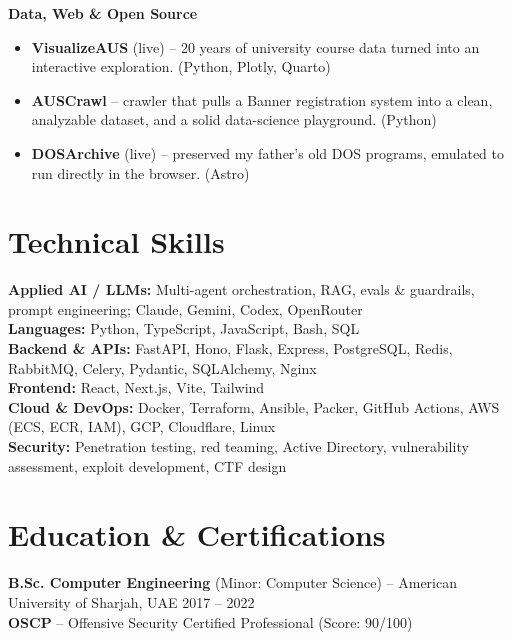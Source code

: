 \documentclass[10pt,a4paper]{article}
\begin{document}
\vspace{2pt}
{\small\textbf{Data, Web \& Open Source}}
\begin{itemize}
    \item {\small \textbf{VisualizeAUS} (live) -- 20 years of university course data turned into an interactive exploration. (Python, Plotly, Quarto)}
    \item {\small \textbf{AUSCrawl} -- crawler that pulls a Banner registration system into a clean, analyzable dataset, and a solid data-science playground. (Python)}
    \item {\small \textbf{DOSArchive} (live) -- preserved my father's old DOS programs, emulated to run directly in the browser. (Astro)}
\end{itemize}

\section{Technical Skills}
{\small
\textbf{Applied AI / LLMs:} Multi-agent orchestration, RAG, evals \& guardrails, prompt engineering; Claude, Gemini, Codex, OpenRouter\\
\textbf{Languages:} Python, TypeScript, JavaScript, Bash, SQL\\
\textbf{Backend \& APIs:} FastAPI, Hono, Flask, Express, PostgreSQL, Redis, RabbitMQ, Celery, Pydantic, SQLAlchemy, Nginx\\
\textbf{Frontend:} React, Next.js, Vite, Tailwind\\
\textbf{Cloud \& DevOps:} Docker, Terraform, Ansible, Packer, GitHub Actions, AWS (ECS, ECR, IAM), GCP, Cloudflare, Linux\\
\textbf{Security:} Penetration testing, red teaming, Active Directory, vulnerability assessment, exploit development, CTF design
}

\section{Education \& Certifications}
{\small
\textbf{B.Sc. Computer Engineering} (Minor: Computer Science) -- American University of Sharjah, UAE \hfill 2017 -- 2022\\
\textbf{OSCP} -- Offensive Security Certified Professional (Score: 90/100)
}

\end{document}
